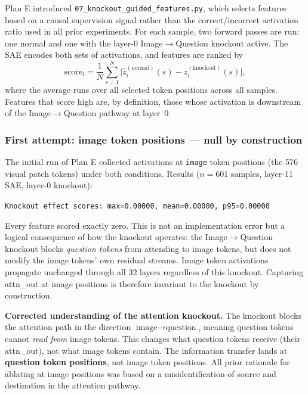 \documentclass[11pt,a4paper]{article}
\begin{document}
Plan E introduced \texttt{07\_knockout\_guided\_features.py}, which selects features based on a
causal supervision signal rather than the correct/incorrect activation ratio used in all prior
experiments.
For each sample, two forward passes are run: one normal and one with the layer-0 Image$\to$Question
knockout active. The SAE encodes both sets of activations, and features are ranked by
\begin{equation}
  \text{score}_i = \frac{1}{N} \sum_{s=1}^{N}
    \bigl|\hat{z}_i^{(\text{normal})}(s) - \hat{z}_i^{(\text{knockout})}(s)\bigr|,
  \label{eq:ko_score}
\end{equation}
where the average runs over all selected token positions across all samples.
Features that score high are, by definition, those whose activation is downstream of the
Image$\to$Question pathway at layer~0.

\subsubsection{First attempt: image token positions — null by construction}

The initial run of Plan E collected activations at \texttt{image} token positions (the 576 visual
patch tokens) under both conditions. Results ($n = 601$ samples, layer-11 SAE, layer-0 knockout):

\begin{center}
\texttt{Knockout effect scores: max=0.00000, mean=0.00000, p95=0.00000}
\end{center}

Every feature scored exactly zero. This is not an implementation error but a logical consequence of
how the knockout operates: the Image$\to$Question knockout blocks \emph{question tokens} from
attending to image tokens, but does not modify the image tokens' own residual streams.
Image token activations propagate unchanged through all 32 layers regardless of this knockout.
Capturing attn\_out at image positions is therefore invariant to the knockout by construction.

\textbf{Corrected understanding of the attention knockout.}
The knockout blocks the attention path in the direction
$\text{image} \to \text{question}$, meaning question tokens cannot \emph{read from} image tokens.
This changes what question tokens receive (their attn\_out), not what image tokens contain.
The information transfer lands at \textbf{question token positions}, not image token positions.
All prior rationale for ablating at image positions was based on a misidentification of source and
destination in the attention pathway.
\end{document}
